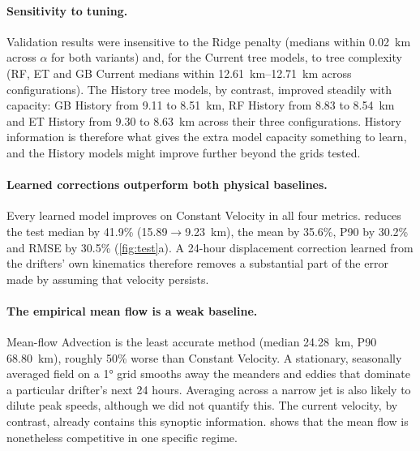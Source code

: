 \paragraph{Sensitivity to tuning.} Validation results were insensitive to the Ridge penalty (medians within \SI{0.02}{km} across $\alpha$ for both variants) and, for the Current tree models, to tree complexity (RF, ET and GB Current medians within \SIrange{12.61}{12.71}{km} across configurations). The History tree models, by contrast, improved steadily with capacity: GB History from \SI{9.11}{} to \SI{8.51}{km}, RF History from \SI{8.83}{} to \SI{8.54}{km} and ET History from \SI{9.30}{} to \SI{8.63}{km} across their three configurations. History information is therefore what gives the extra model capacity something to learn, and the History models might improve further beyond the grids tested.

\paragraph{Learned corrections outperform both physical baselines.} Every learned model improves on Constant Velocity in all four metrics. \GBH{} reduces the test median by 41.9\% (\SI{15.89}{}$\to$\SI{9.23}{km}), the mean by 35.6\%, P90 by 30.2\% and RMSE by 30.5\% (\cref{fig:test}a). A 24-hour displacement correction learned from the drifters' own kinematics therefore removes a substantial part of the error made by assuming that velocity persists.

\paragraph{The empirical mean flow is a weak baseline.} Mean-flow Advection is the least accurate method (median \SI{24.28}{km}, P90 \SI{68.80}{km}), roughly 50\% worse than Constant Velocity. A stationary, seasonally averaged field on a \ang{1} grid smooths away the meanders and eddies that dominate a particular drifter's next 24 hours. Averaging across a narrow jet is also likely to dilute peak speeds, although we did not quantify this. The current velocity, by contrast, already contains this synoptic information.  shows that the mean flow is nonetheless competitive in one specific regime.

